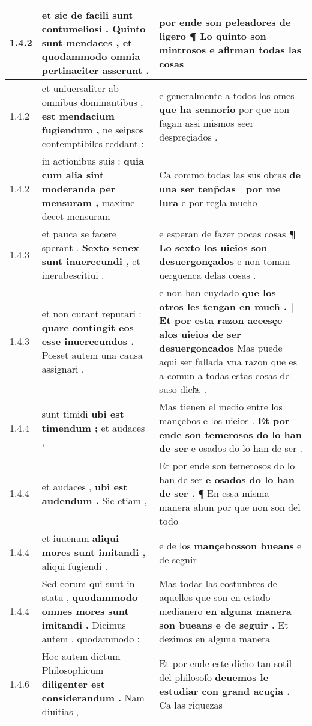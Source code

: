 \begin{tabular}{|p{1cm}|p{6.5cm}|p{6.5cm}|}
1.4.2 & et sic de facili sunt contumeliosi . \textbf{ Quinto sunt mendaces , } et quodammodo omnia pertinaciter asserunt . & por ende son peleadores de ligero ¶ \textbf{ Lo quinto son mintrosos } e afirman todas las cosas \\\hline
1.4.2 & et uniuersaliter ab omnibus dominantibus , \textbf{ est mendacium fugiendum , } ne seipsos contemptibiles reddant : & e generalmente a todos los omes \textbf{ que ha sennorio } por que non fagan assi mismos seer despreçiados . \\\hline
1.4.2 & in actionibus suis : \textbf{ quia cum alia sint moderanda per mensuram , } maxime decet mensuram & Ca commo todas las sus obras \textbf{ de una ser tenp̃das | por me lura } e por regla mucho \\\hline
1.4.3 & et pauca se facere sperant . \textbf{ Sexto senex sunt inuerecundi , } et inerubescitiui . & e esperan de fazer pocas cosas \textbf{ ¶ Lo sexto los uieios son desuergonçados } e non toman uerguenca delas cosas . \\\hline
1.4.3 & et non curant reputari : \textbf{ quare contingit eos esse inuerecundos . } Posset autem una causa assignari , & e non han cuydado \textbf{ que los otros les tengan en much̃ . | Et por esta razon aceesçe alos uieios de ser desuergoncados } Mas puede aqui ser fallada vna razon que es a comun a todas estas cosas de suso dichͣs . \\\hline
1.4.4 & sunt timidi \textbf{ ubi est timendum ; } et audaces , & Mas tienen el medio entre los mançebos e los uieios . \textbf{ Et por ende son temerosos do lo han de ser } e osados do lo han de ser . \\\hline
1.4.4 & et audaces , \textbf{ ubi est audendum . } Sic etiam , & Et por ende son temerosos do lo han de ser \textbf{ e osados do lo han de ser . } ¶ En essa misma manera ahun por que non son del todo \\\hline
1.4.4 & et iuuenum \textbf{ aliqui mores sunt imitandi , } aliqui fugiendi . & e de los \textbf{ mançebosson bueans } e de segnir \\\hline
1.4.4 & Sed eorum qui sunt in statu , \textbf{ quodammodo omnes mores sunt imitandi . } Dicimus autem , quodammodo : & Mas todas las costunbres de aquellos que son en estado medianero \textbf{ en alguna manera son bueans e de seguir . } Et dezimos en alguna manera \\\hline
1.4.6 & Hoc autem dictum Philosophicum \textbf{ diligenter est considerandum . } Nam diuitias , & Et por ende este dicho tan sotil del philosofo \textbf{ deuemos le estudiar con grand acuçia . } Ca las riquezas \\\hline

\end{tabular}
